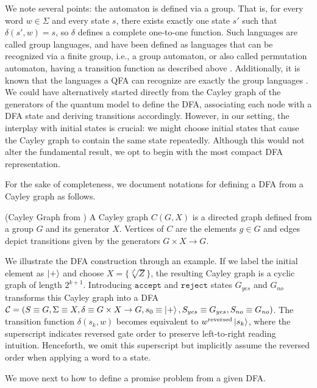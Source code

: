 \documentclass[../main.tex]{subfiles}
\begin{document}
We note several points: the automaton is defined via a group. That is, for every word $w \in \Sigma$ and every state $s$, there exists exactly one state $s'$ such that $\delta(s',w)=s$, so $\delta$ defines a complete one-to-one function. Such languages are called group languages, and have been defined as languages that can be recognized via a finite group, i.e., a group automaton, or also called permutation automaton, having a transition function as described above \cite{thierrin1968permutation,place2022group}. Additionally, it is known that the languages a \ac{QFA} can recognize are exactly the group languages \cite{brodsky1999characterizations}. We could have alternatively started directly from the Cayley graph of the generators of the quantum model to define the DFA, associating each node with a DFA state and deriving transitions accordingly. However, in our setting, the interplay with initial states is crucial: we might choose initial states that cause the Cayley graph to contain the same state repeatedly. Although this would not alter the fundamental result, we opt to begin with the most compact DFA representation.

For the sake of completeness, we document notations for defining a \ac{DFA} from a Cayley graph as follows.

\begin{definition} (Cayley Graph from \cite{cayley1878desiderata})
     A Cayley graph $C(G,X)$ is a directed graph defined from a group $G$ and its generator $X$. Vertices of $C$ are the elements $g \in G$ and edges depict transitions given by the generators $G \times X \rightarrow G$.
\end{definition}

We illustrate the \ac{DFA} construction through an example. If we label the initial element as $\ket{+}$ and choose $X = \{ \sqrt[2^k]{Z} \}$, the resulting Cayley graph is a cyclic graph of length $2^{k+1}$. Introducing $\mathtt{accept}$ and $\mathtt{reject}$  states $G_{yes}$ and $G_{no}$ transforms this Cayley graph into a DFA $\mathcal{C} = (S \equiv G, \Sigma \equiv X, \delta \equiv G \times X \rightarrow G, s_0 \equiv \ket{+}, S_{yes} \equiv G_{yes}, S_{no} \equiv G_{no})$. The transition function $\delta(s_k,w)$ becomes equivalent to $w^{\text{reversed}}\ket{s_k}$, where the superscript indicates reversed gate order to preserve left-to-right reading intuition. Henceforth, we omit this superscript but implicitly assume the reversed order when applying a word to a state.

We move next to how to define a promise problem from a given DFA.
\end{document}
